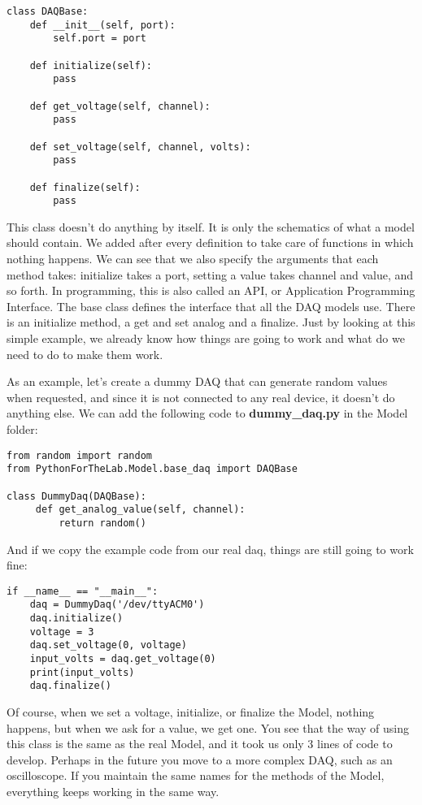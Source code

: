\begin{verbatim}
class DAQBase:
    def __init__(self, port):
        self.port = port

    def initialize(self):
        pass

    def get_voltage(self, channel):
        pass

    def set_voltage(self, channel, volts):
        pass

    def finalize(self):
        pass
\end{verbatim}

This class doesn't do anything by itself. It is only the schematics of what a model should contain. We added  after every definition to take care of functions in which nothing happens. We can see that we also specify the arguments that each method takes: initialize takes a port, setting a value takes channel and value, and so forth. In programming, this is also called an API, or Application Programming Interface. The base class defines the interface that all the DAQ models use. There is an initialize method, a get and set analog and a finalize. Just by looking at this simple example, we already know how things are going to work and what do we need to do to make them work.

As an example, let's create a dummy DAQ that can generate random values when requested, and since it is not connected to any real device, it doesn't do anything else. We can add the following code to \textbf{dummy\_daq.py} in the Model folder:

\begin{verbatim}
from random import random
from PythonForTheLab.Model.base_daq import DAQBase

class DummyDaq(DAQBase):
     def get_analog_value(self, channel):
         return random()
\end{verbatim}

And if we copy the example code from our real daq, things are still going to work fine:

\begin{verbatim}
if __name__ == "__main__":
    daq = DummyDaq('/dev/ttyACM0')
    daq.initialize()
    voltage = 3
    daq.set_voltage(0, voltage)
    input_volts = daq.get_voltage(0)
    print(input_volts)
    daq.finalize()
\end{verbatim}

Of course, when we set a voltage, initialize, or finalize the Model, nothing happens, but when we ask for a value, we get one. You see that the way of using this class is the same as the real Model, and it took us only 3 lines of code to develop. Perhaps in the future you move to a more complex DAQ, such as an oscilloscope. If you maintain the same names for the methods of the Model, everything keeps working in the same way.

